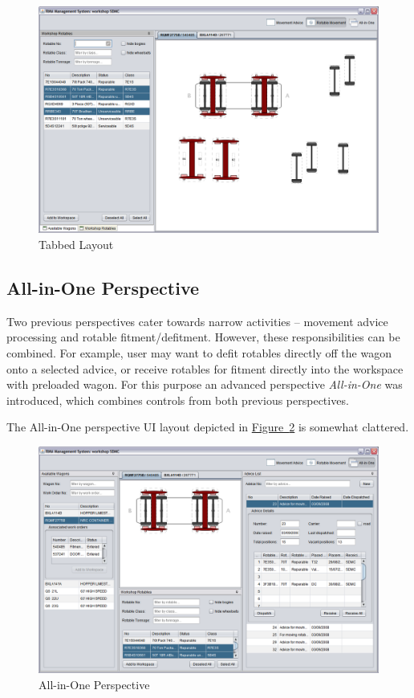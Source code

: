 \begin{figure}[!h]
\centering
\includegraphics[scale=0.37]{chapters/02-user-interface/images/05-rotable-movement-perspective-with-tabs.png}
\caption{Tabbed Layout}\label{fig:05-rotable-movement-perspective-with-tabs}
\end{figure}
\clearpage

\subsection{All-in-One Perspective}
Two previous perspectives cater towards narrow activities -- movement advice processing and rotable fitment/defitment. However, these responsibilities can be combined. For example, user may want to defit rotables directly off the wagon onto a selected advice, or receive rotables for fitment directly into the workspace with preloaded wagon. For this purpose an advanced perspective \emph{All-in-One} was introduced, which combines controls from both previous perspectives.

The All-in-One perspective UI layout depicted in \hyperref[fig:06-all-in-one.png]{Figure~\ref*{fig:06-all-in-one}} is somewhat clattered. 

\begin{figure}[!h]
\centering
\includegraphics[scale=0.37]{chapters/02-user-interface/images/06-all-in-one.png}
\caption{All-in-One Perspective}\label{fig:06-all-in-one}
\end{figure}

